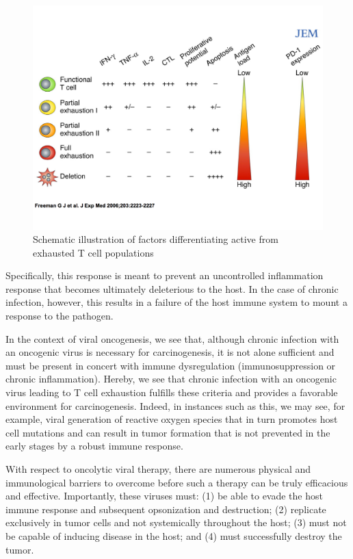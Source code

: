 \documentclass[11pt,letterpaper,final] {article}
\begin{document}
\begin{figure}[htp]
\includegraphics[width=\textwidth]{exhaustion}
\caption{Schematic illustration of factors differentiating active from exhausted T cell populations}
\label{fig01}
\end{figure}

Specifically, this response is meant to prevent an uncontrolled inflammation response that becomes ultimately deleterious to the host. In the case of chronic infection, however, this results in a failure of the host immune system to mount a response to the pathogen.

In the context of viral oncogenesis, we see that, although chronic infection with an oncogenic virus is necessary for carcinogenesis, it is not alone sufficient and must be present in concert with immune dysregulation (immunosuppression or chronic inflammation). Hereby, we see that chronic infection with an oncogenic virus leading to T cell exhaustion fulfills these criteria and provides a favorable environment for carcinogenesis. Indeed, in instances such as this, we may see, for example, viral generation of reactive oxygen species that in turn promotes host cell mutations and can result in tumor formation that is not prevented in the early stages by a robust immune response.

With respect to oncolytic viral therapy, there are numerous physical and immunological barriers to overcome before such a therapy can be truly efficacious and effective. Importantly, these viruses must: (1) be able to evade the host immune response and subsequent opsonization and destruction; (2) replicate exclusively in tumor cells and not systemically throughout the host; (3) must not be capable of inducing disease in the host; and (4) must successfully destroy the tumor.
\end{document}
